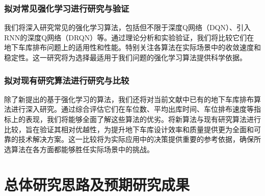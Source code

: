 \subsubsection{拟对常见强化学习进行研究与验证}
我们将深入研究常见的强化学习算法，包括但不限于深度Q网络（DQN）\cite{mnih2013playing}、引入RNN的深度Q网络（DRQN）等。通过理论分析和实验验证，我们将比较它们在地下车库排布问题上的适用性和性能。特别关注各算法在实际场景中的收敛速度和稳定性。这一研究将为选择最适用于我们问题的强化学习算法提供科学依据。
\subsubsection{拟对现有研究算法进行研究与比较}
除了新提出的基于强化学习的算法，我们还将对当前文献中已有的地下车库排布算法进行深入研究。通过综合评估它们在车位数、平均出库时间、车位排布速度等指标上的表现，我们将能够全面了解这些算法的优劣。将新算法与现有研究算法进行比较，旨在验证其相对优越性，为提升地下车库设计效率和质量提供更为全面和可靠的技术解决方案。这一比较将为实际应用中的决策提供重要的参考依据，确保所选算法在各方面都能够胜任实际场景中的挑战。
\section{总体研究思路及预期研究成果}
